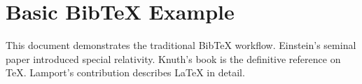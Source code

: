 \documentclass[11pt]{article}
\begin{document}
\section*{Basic BibTeX Example}

This document demonstrates the traditional BibTeX workflow.
Einstein's seminal paper \cite{einstein1905} introduced special relativity.
Knuth's book \cite{knuth1984} is the definitive reference on \TeX.
Lamport's contribution \cite{lamport1994} describes \LaTeX{} in detail.



\end{document}

